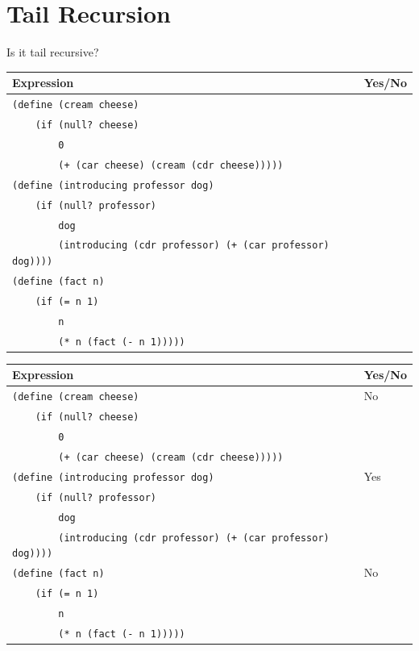 \documentclass{exam}
\begin{document}
\section{Tail Recursion}
\begin{questions}

\item Is it tail recursive?
\begin{center}
    \begin{tabular}{|m{13cm}|m{1.5cm}|}
\hline
\textbf{Expression} & \textbf{Yes/No} \\
\hline
\lstinline$(define (cream cheese)$ &  \\
\lstinline$    (if (null? cheese)$ & \\ 
\lstinline$        0$ & \\
\lstinline$        (+ (car cheese) (cream (cdr cheese)))))$ & \\
\hline
\lstinline$(define (introducing professor dog)$ &  \\
\lstinline$    (if (null? professor)$ & \\ 
\lstinline$        dog$ & \\
\lstinline$        (introducing (cdr professor) (+ (car professor) dog))))$ & \\
\hline
\lstinline$(define (fact n)$ &  \\
\lstinline$    (if (= n 1)$ & \\ 
\lstinline$        n$ & \\
\lstinline$        (* n (fact (- n 1)))))$ & \\
\hline
\end{tabular}
\end{center}

\begin{solution}
\begin{center}
    \begin{tabular}{|m{13cm}|m{1.5cm}|}
\hline
\textbf{Expression} & \textbf{Yes/No} \\
\hline
\lstinline$(define (cream cheese)$ & {\color{red} No}  \\
\lstinline$    (if (null? cheese)$ & \\ 
\lstinline$        0$ & \\
\lstinline$        (+ (car cheese) (cream (cdr cheese)))))$ & \\
\hline
\lstinline$(define (introducing professor dog)$ &  {\color{red} Yes}\\
\lstinline$    (if (null? professor)$ & \\ 
\lstinline$        dog$ & \\
\lstinline$        (introducing (cdr professor) (+ (car professor) dog))))$ & \\
\hline
\lstinline$(define (fact n)$ & {\color{red} No} \\
\lstinline$    (if (= n 1)$ & \\ 
\lstinline$        n$ & \\
\lstinline$        (* n (fact (- n 1)))))$ & \\
\hline
\end{tabular}
\end{center}
\end{solution}




\end{questions}
\end{document}
